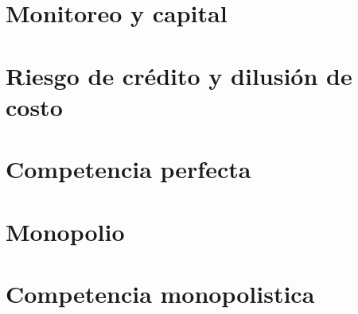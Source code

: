 \section{Monitoreo y capital}

\section{Riesgo de crédito y dilusión de costo}

\section{Competencia perfecta}

\section{Monopolio}

\section{Competencia monopolistica}

